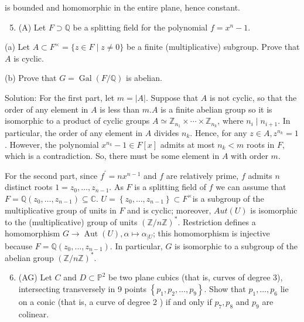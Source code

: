 \documentclass[10pt]{article}
\begin{document}
is bounded and homomorphic in the entire plane, hence constant.

\begin{enumerate}
  \setcounter{enumi}{4}
  \item (A) Let $F \supset \mathbb{Q}$ be a splitting field for the polynomial $f=x^{n}-1$.
\end{enumerate}

(a) Let $A \subset F^{\times}=\{z \in F \mid z \neq 0\}$ be a finite (multiplicative) subgroup. Prove that $A$ is cyclic.

(b) Prove that $G=\operatorname{Gal}(F / \mathbb{Q})$ is abelian.

Solution: For the first part, let $m=|A|$. Suppose that $A$ is not cyclic, so that the order of any element in $A$ is less than $m . A$ is a finite abelian group so it is isomorphic to a product of cyclic groups $A \simeq \mathbb{Z}_{n_{1}} \times \cdots \times \mathbb{Z}_{n_{k}}$, where $n_{i} \mid n_{i+1}$. In particular, the order of any element in $A$ divides $n_{k}$. Hence, for any $z \in A, z^{n_{k}}=1$. However, the polynomial $x^{n_{k}}-1 \in F[x]$ admits at most $n_{k}<m$ roots in $F$, which is a contradiction. So, there must be some element in $A$ with order $m$.

For the second part, since $f^{\prime}=n x^{n-1}$ and $f$ are relatively prime, $f$ admits $n$ distinct roots $1=z_{0}, \ldots, z_{n-1}$. As $F$ is a splitting field of $f$ we can assume that $F=\mathbb{Q}\left(z_{0}, \ldots, z_{n-1}\right) \subseteq \mathbb{C}$. $U=\left\{z_{0}, \ldots, z_{n-1}\right\} \subset F^{\times}$is a subgroup of the multiplicative group of units in $F$ and is cyclic; moreover, $A u t(U)$ is isomorphic to the (multiplicative) group of units $(\mathbb{Z} / n \mathbb{Z})^{*}$. Restriction defines a homomorphism $G \rightarrow \operatorname{Aut}(U), \alpha \mapsto \alpha_{\mid U}$; this homomorphism is injective because $F=\mathbb{Q}\left(z_{0}, \ldots, z_{n-1}\right)$. In particular, $G$ is isomorphic to a subgroup of the abelian group $(\mathbb{Z} / n \mathbb{Z})^{*}$.

\begin{enumerate}
  \setcounter{enumi}{5}
  \item (AG) Let $C$ and $D \subset \mathbb{P}^{2}$ be two plane cubics (that is, curves of degree 3), intersecting transversely in 9 points $\left\{p_{1}, p_{2}, \ldots, p_{9}\right\}$. Show that $p_{1}, \ldots, p_{6}$ lie on a conic (that is, a curve of degree 2 ) if and only if $p_{7}, p_{8}$ and $p_{9}$ are colinear.
\end{enumerate}
\end{document}
